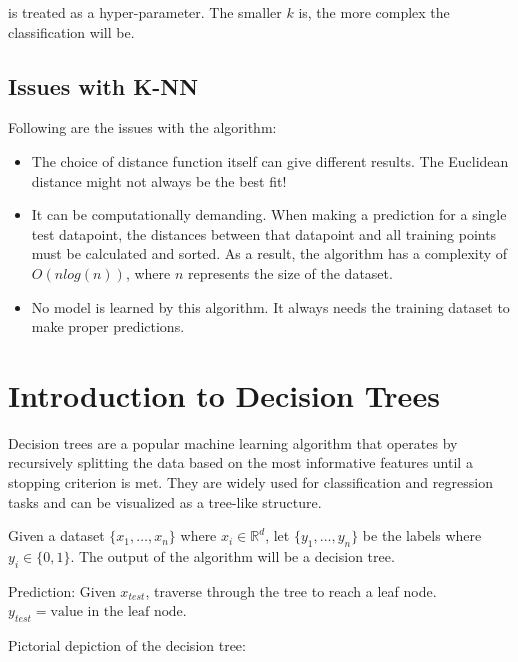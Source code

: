 \documentclass[
]{article}
\providecommand{\tightlist}{%
  \setlength{\itemsep}{0pt}\setlength{\parskip}{0pt}}
\begin{document}
is treated as a hyper-parameter. The smaller \(k\) is, the more complex
the classification will be.

\newpage
\hypertarget{issues-with-k-nn}{%
\subsection{Issues with K-NN}\label{issues-with-k-nn}}

Following are the issues with the algorithm:

\begin{itemize}
\tightlist
\item
  The choice of distance function itself can give different results. The
  Euclidean distance might not always be the best fit!
\item
  It can be computationally demanding. When making a prediction for a
  single test datapoint, the distances between that datapoint and all
  training points must be calculated and sorted. As a result, the
  algorithm has a complexity of \(O(nlog(n))\), where \(n\) represents
  the size of the dataset.
\item
  No model is learned by this algorithm. It always needs the training
  dataset to make proper predictions.
\end{itemize}

\newpage
\hypertarget{introduction-to-decision-trees}{%
\section{Introduction to Decision
Trees}\label{introduction-to-decision-trees}}

Decision trees are a popular machine learning algorithm that operates by
recursively splitting the data based on the most informative features
until a stopping criterion is met. They are widely used for
classification and regression tasks and can be visualized as a tree-like
structure.

Given a dataset \(\{x_1, \ldots, x_n\}\) where \(x_i \in \mathbb{R}^d\),
let \(\{y_1, \ldots, y_n\}\) be the labels where \(y_i \in \{0, 1\}\).
The output of the algorithm will be a decision tree.

Prediction: Given \(x_{test}\), traverse through the tree to reach a
leaf node. \(y_{test} = \text{value in the leaf node}\).

Pictorial depiction of the decision tree:
\end{document}
